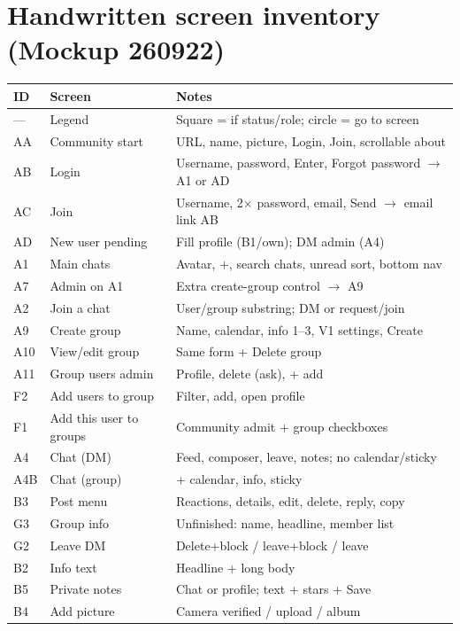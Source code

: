\documentclass[11pt,a4paper]{article}
\begin{document}
\newpage
\appendix
\section{Handwritten screen inventory (Mockup 260922)}
\begin{longtable}{@{}p{1.6cm}p{4.4cm}p{8.2cm}@{}}
\toprule
\textbf{ID} & \textbf{Screen} & \textbf{Notes} \\
\midrule
\endhead
--- & Legend & Square = if status/role; circle = go to screen \\
AA & Community start & URL, name, picture, Login, Join, scrollable about \\
AB & Login & Username, password, Enter, Forgot password $\rightarrow$ A1 or AD \\
AC & Join & Username, 2$\times$ password, email, Send $\rightarrow$ email link AB \\
AD & New user pending & Fill profile (B1/own); DM admin (A4) \\
A1 & Main chats & Avatar, +, search chats, unread sort, bottom nav \\
A7 & Admin on A1 & Extra create-group control $\rightarrow$ A9 \\
A2 & Join a chat & User/group substring; DM or request/join \\
A9 & Create group & Name, calendar, info 1--3, V1 settings, Create \\
A10 & View/edit group & Same form + Delete group \\
A11 & Group users admin & Profile, delete (ask), + add \\
F2 & Add users to group & Filter, add, open profile \\
F1 & Add this user to groups & Community admit + group checkboxes \\
A4 & Chat (DM) & Feed, composer, leave, notes; no calendar/sticky \\
A4B & Chat (group) & + calendar, info, sticky \\
B3 & Post menu & Reactions, details, edit, delete, reply, copy \\
G3 & Group info & Unfinished: name, headline, member list \\
G2 & Leave DM & Delete+block / leave+block / leave \\
B2 & Info text & Headline + long body \\
B5 & Private notes & Chat or profile; text + stars + Save \\
B4 & Add picture & Camera verified / upload / album \\

\end{longtable}
\end{document}
